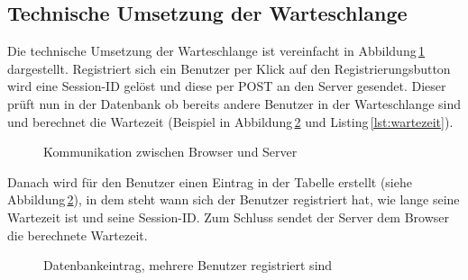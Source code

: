 \subsection{Technische Umsetzung der Warteschlange}
Die technische Umsetzung der Warteschlange ist vereinfacht in Abbildung\,\ref{img:warteschlangeprinzip} dargestellt. Registriert sich ein Benutzer per Klick auf den Registrierungsbutton wird eine Session-ID gelöst und diese per POST an den Server gesendet. Dieser prüft nun in der Datenbank ob bereits andere Benutzer in der Warteschlange sind und berechnet die Wartezeit (Beispiel in Abbildung\,\ref{img:tblqueuemitBenutzer} und Listing\,\ref{lst:wartezeit}).

\begin{figure}[htbp!]
	\centering
	\caption{Kommunikation zwischen Browser und Server}
	\label{img:warteschlangeprinzip}
\end{figure}

\noindent
Danach wird für den Benutzer einen Eintrag in der Tabelle erstellt (siehe Abbildung\,\ref{img:tblqueuemitBenutzer}), in dem steht wann sich der Benutzer registriert hat, wie lange seine Wartezeit ist und seine Session-ID. Zum Schluss sendet der Server dem Browser die berechnete Wartezeit.

\begin{figure}[htbp!]
	\centering
	\caption{Datenbankeintrag, mehrere Benutzer registriert sind}
	\label{img:tblqueuemitBenutzer}
\end{figure}


